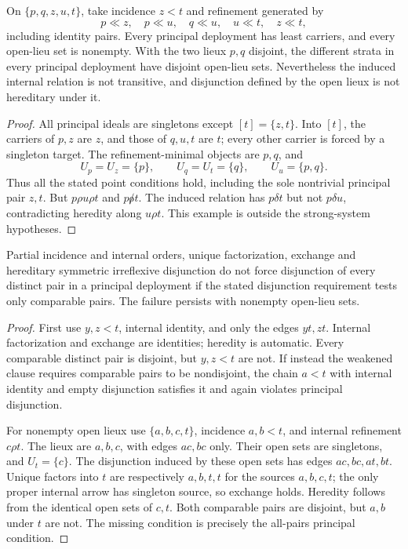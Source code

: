\begin{counterexample}
\label{ex:nontransitive}
On $\{p,q,z,u,t\}$, take incidence $z<t$ and refinement generated by
\[
 p\ll z,\quad p\ll u,\quad q\ll u,\quad u\ll t,
 \quad z\ll t,
\]
including identity pairs. Every principal deployment has least
carriers, and every open-lieu set is nonempty. With the two lieux
$p,q$ disjoint, the different strata in every principal deployment
have disjoint open-lieu sets. Nevertheless the induced internal
relation is not transitive, and disjunction defined by the open
lieux is not hereditary under it.
\end{counterexample}
\begin{proof}
All principal ideals are singletons except $[t]=\{z,t\}$.
Into $[t]$, the carriers of $p,z$ are $z$, and those of $q,u,t$
are $t$; every other carrier is forced by a singleton target.
The refinement-minimal objects are $p,q$, and
\[
 U_p=U_z=\{p\},\qquad U_q=U_t=\{q\},\qquad U_u=\{p,q\}.
\]
Thus all the stated point conditions hold, including the sole
nontrivial principal pair $z,t$. But
$p\rho u\rho t$ and $p\not\rho t$. The induced relation has
$p\delta t$ but not $p\delta u$, contradicting heredity along
$u\rho t$. This example is outside the strong-system hypotheses.
\end{proof}

\begin{counterexample}
\label{ex:weak-principal}
Partial incidence and internal orders, unique factorization,
exchange and hereditary symmetric irreflexive disjunction do not
force disjunction of every distinct pair in a principal deployment
if the stated disjunction requirement tests only comparable pairs.
The failure persists with nonempty open-lieu sets.
\end{counterexample}
\begin{proof}
First use $y,z<t$, internal identity, and only the edges $yt,zt$.
Internal factorization and exchange are identities; heredity is
automatic. Every comparable distinct pair is disjoint, but
$y,z<t$ are not. If instead the weakened clause requires comparable
pairs to be nondisjoint, the chain $a<t$ with internal identity and
empty disjunction satisfies it and again violates principal
disjunction.

For nonempty open lieux use $\{a,b,c,t\}$, incidence $a,b<t$,
and internal refinement $c\rho t$. The lieux are $a,b,c$,
with edges $ac,bc$ only. Their open sets are singletons, and
$U_t=\{c\}$. The disjunction induced by these open sets has
edges $ac,bc,at,bt$. Unique factors into $t$ are respectively
$a,b,t,t$ for the sources $a,b,c,t$; the only proper internal
arrow has singleton source, so exchange holds. Heredity follows
from the identical open sets of $c,t$. Both comparable pairs
are disjoint, but $a,b$ under $t$ are not. The missing condition
is precisely the all-pairs principal condition.
\end{proof}

